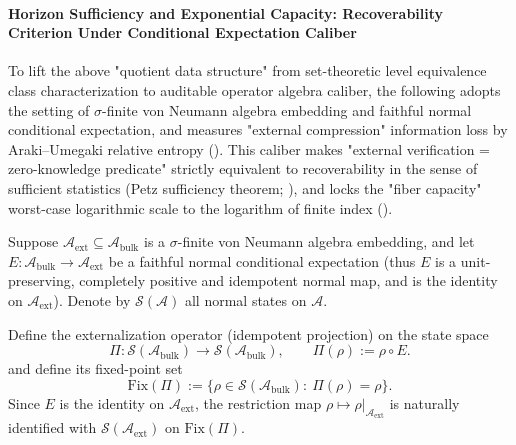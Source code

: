 \paragraph{Horizon Sufficiency and Exponential Capacity: Recoverability Criterion Under Conditional Expectation Caliber}
To lift the above "quotient data structure" from set-theoretic level equivalence class characterization to auditable operator algebra caliber,
the following adopts the setting of \(\sigma\)-finite von Neumann algebra embedding and faithful normal conditional expectation,
and measures "external compression" information loss by Araki--Umegaki relative entropy (\cite{Araki1976RelativeEntropyVonNeumann}).
This caliber makes "external verification = zero-knowledge predicate" strictly equivalent to recoverability in the sense of sufficient statistics (Petz sufficiency theorem; \cite{Petz1986SufficientSubalgebrasRelativeEntropy,Petz2003MonotonicityRelativeEntropyRevisited}),
and locks the "fiber capacity" worst-case logarithmic scale to the logarithm of finite index (\cite{PimsnerPopa1986EntropyIndexSubfactors,Hiai1991MinimumIndexSubfactorsEntropyII}).

\begin{definition}\label{def:dephys-conditional-expectation-externalization-map}
Suppose \(\mathcal{A}_{\mathrm{ext}}\subseteq \mathcal{A}_{\mathrm{bulk}}\) is a \(\sigma\)-finite von Neumann algebra embedding,
and let \(E:\mathcal{A}_{\mathrm{bulk}}\to\mathcal{A}_{\mathrm{ext}}\) be a faithful normal conditional expectation (thus \(E\) is a unit-preserving, completely positive and idempotent normal map, and is the identity on \(\mathcal{A}_{\mathrm{ext}}\)).
Denote by \(\mathcal{S}(\mathcal{A})\) all normal states on \(\mathcal{A}\).
\par
Define the externalization operator (idempotent projection) on the state space
\begin{equation}\label{eq:dephys-ext-externalization-Pi}
\boxed{\;
\Pi:\mathcal{S}(\mathcal{A}_{\mathrm{bulk}})\to \mathcal{S}(\mathcal{A}_{\mathrm{bulk}}),
\qquad
\Pi(\rho):=\rho\circ E.\;}
\end{equation}
and define its fixed-point set
\[
\mathrm{Fix}(\Pi):=\{\rho\in\mathcal{S}(\mathcal{A}_{\mathrm{bulk}}):\ \Pi(\rho)=\rho\}.
\]
Since \(E\) is the identity on \(\mathcal{A}_{\mathrm{ext}}\), the restriction map \(\rho\mapsto \rho|_{\mathcal{A}_{\mathrm{ext}}}\) is naturally identified with \(\mathcal{S}(\mathcal{A}_{\mathrm{ext}})\) on \(\mathrm{Fix}(\Pi)\).
\end{definition}

